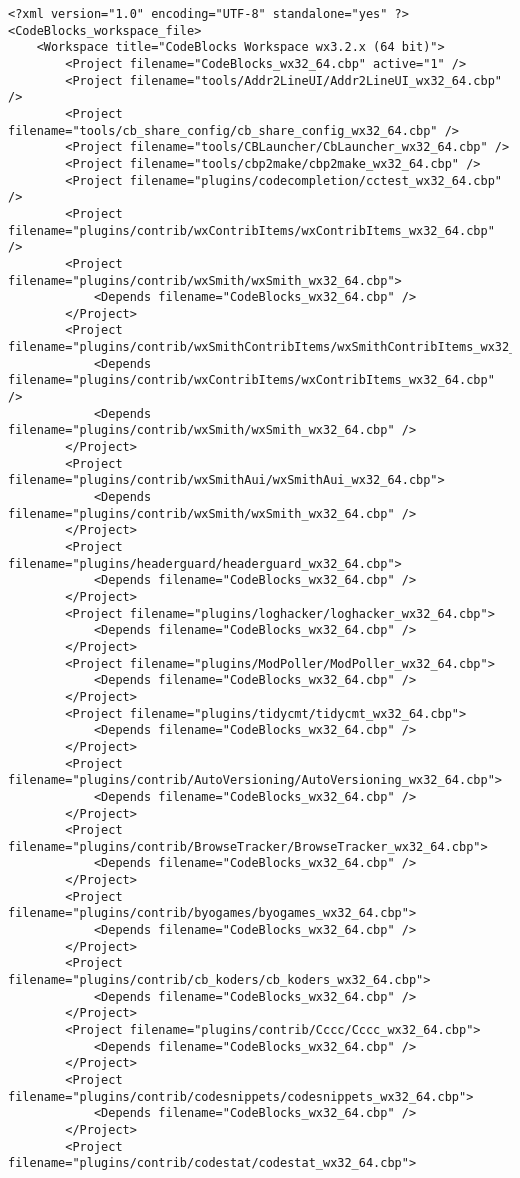 {\footnotesize
\begin{verbatim}
<?xml version="1.0" encoding="UTF-8" standalone="yes" ?>
<CodeBlocks_workspace_file>
	<Workspace title="CodeBlocks Workspace wx3.2.x (64 bit)">
		<Project filename="CodeBlocks_wx32_64.cbp" active="1" />
		<Project filename="tools/Addr2LineUI/Addr2LineUI_wx32_64.cbp" />
		<Project filename="tools/cb_share_config/cb_share_config_wx32_64.cbp" />
		<Project filename="tools/CBLauncher/CbLauncher_wx32_64.cbp" />
		<Project filename="tools/cbp2make/cbp2make_wx32_64.cbp" />
		<Project filename="plugins/codecompletion/cctest_wx32_64.cbp" />
		<Project filename="plugins/contrib/wxContribItems/wxContribItems_wx32_64.cbp" />
		<Project filename="plugins/contrib/wxSmith/wxSmith_wx32_64.cbp">
			<Depends filename="CodeBlocks_wx32_64.cbp" />
		</Project>
		<Project filename="plugins/contrib/wxSmithContribItems/wxSmithContribItems_wx32_64.cbp">
			<Depends filename="plugins/contrib/wxContribItems/wxContribItems_wx32_64.cbp" />
			<Depends filename="plugins/contrib/wxSmith/wxSmith_wx32_64.cbp" />
		</Project>
		<Project filename="plugins/contrib/wxSmithAui/wxSmithAui_wx32_64.cbp">
			<Depends filename="plugins/contrib/wxSmith/wxSmith_wx32_64.cbp" />
		</Project>
		<Project filename="plugins/headerguard/headerguard_wx32_64.cbp">
			<Depends filename="CodeBlocks_wx32_64.cbp" />
		</Project>
		<Project filename="plugins/loghacker/loghacker_wx32_64.cbp">
			<Depends filename="CodeBlocks_wx32_64.cbp" />
		</Project>
		<Project filename="plugins/ModPoller/ModPoller_wx32_64.cbp">
			<Depends filename="CodeBlocks_wx32_64.cbp" />
		</Project>
		<Project filename="plugins/tidycmt/tidycmt_wx32_64.cbp">
			<Depends filename="CodeBlocks_wx32_64.cbp" />
		</Project>
		<Project filename="plugins/contrib/AutoVersioning/AutoVersioning_wx32_64.cbp">
			<Depends filename="CodeBlocks_wx32_64.cbp" />
		</Project>
		<Project filename="plugins/contrib/BrowseTracker/BrowseTracker_wx32_64.cbp">
			<Depends filename="CodeBlocks_wx32_64.cbp" />
		</Project>
		<Project filename="plugins/contrib/byogames/byogames_wx32_64.cbp">
			<Depends filename="CodeBlocks_wx32_64.cbp" />
		</Project>
		<Project filename="plugins/contrib/cb_koders/cb_koders_wx32_64.cbp">
			<Depends filename="CodeBlocks_wx32_64.cbp" />
		</Project>
		<Project filename="plugins/contrib/Cccc/Cccc_wx32_64.cbp">
			<Depends filename="CodeBlocks_wx32_64.cbp" />
		</Project>
		<Project filename="plugins/contrib/codesnippets/codesnippets_wx32_64.cbp">
			<Depends filename="CodeBlocks_wx32_64.cbp" />
		</Project>
		<Project filename="plugins/contrib/codestat/codestat_wx32_64.cbp">

\end{verbatim}}
